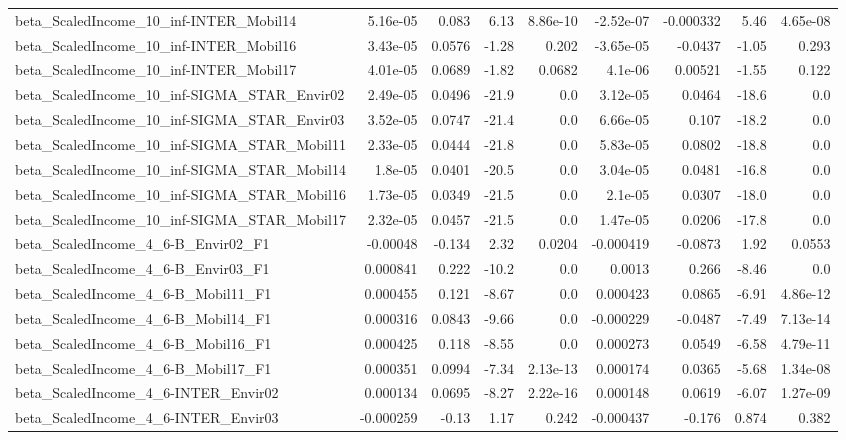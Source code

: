 \begin{tabular}{lrrrrrrrr}
beta_ScaledIncome_10_inf-INTER_Mobil14 & 5.16e-05 & 0.083 & 6.13 & 8.86e-10 & -2.52e-07 & -0.000332 & 5.46 & 4.65e-08 \\
beta_ScaledIncome_10_inf-INTER_Mobil16 & 3.43e-05 & 0.0576 & -1.28 & 0.202 & -3.65e-05 & -0.0437 & -1.05 & 0.293 \\
beta_ScaledIncome_10_inf-INTER_Mobil17 & 4.01e-05 & 0.0689 & -1.82 & 0.0682 & 4.1e-06 & 0.00521 & -1.55 & 0.122 \\
beta_ScaledIncome_10_inf-SIGMA_STAR_Envir02 & 2.49e-05 & 0.0496 & -21.9 & 0.0 & 3.12e-05 & 0.0464 & -18.6 & 0.0 \\
beta_ScaledIncome_10_inf-SIGMA_STAR_Envir03 & 3.52e-05 & 0.0747 & -21.4 & 0.0 & 6.66e-05 & 0.107 & -18.2 & 0.0 \\
beta_ScaledIncome_10_inf-SIGMA_STAR_Mobil11 & 2.33e-05 & 0.0444 & -21.8 & 0.0 & 5.83e-05 & 0.0802 & -18.8 & 0.0 \\
beta_ScaledIncome_10_inf-SIGMA_STAR_Mobil14 & 1.8e-05 & 0.0401 & -20.5 & 0.0 & 3.04e-05 & 0.0481 & -16.8 & 0.0 \\
beta_ScaledIncome_10_inf-SIGMA_STAR_Mobil16 & 1.73e-05 & 0.0349 & -21.5 & 0.0 & 2.1e-05 & 0.0307 & -18.0 & 0.0 \\
beta_ScaledIncome_10_inf-SIGMA_STAR_Mobil17 & 2.32e-05 & 0.0457 & -21.5 & 0.0 & 1.47e-05 & 0.0206 & -17.8 & 0.0 \\
beta_ScaledIncome_4_6-B_Envir02_F1 & -0.00048 & -0.134 & 2.32 & 0.0204 & -0.000419 & -0.0873 & 1.92 & 0.0553 \\
beta_ScaledIncome_4_6-B_Envir03_F1 & 0.000841 & 0.222 & -10.2 & 0.0 & 0.0013 & 0.266 & -8.46 & 0.0 \\
beta_ScaledIncome_4_6-B_Mobil11_F1 & 0.000455 & 0.121 & -8.67 & 0.0 & 0.000423 & 0.0865 & -6.91 & 4.86e-12 \\
beta_ScaledIncome_4_6-B_Mobil14_F1 & 0.000316 & 0.0843 & -9.66 & 0.0 & -0.000229 & -0.0487 & -7.49 & 7.13e-14 \\
beta_ScaledIncome_4_6-B_Mobil16_F1 & 0.000425 & 0.118 & -8.55 & 0.0 & 0.000273 & 0.0549 & -6.58 & 4.79e-11 \\
beta_ScaledIncome_4_6-B_Mobil17_F1 & 0.000351 & 0.0994 & -7.34 & 2.13e-13 & 0.000174 & 0.0365 & -5.68 & 1.34e-08 \\
beta_ScaledIncome_4_6-INTER_Envir02 & 0.000134 & 0.0695 & -8.27 & 2.22e-16 & 0.000148 & 0.0619 & -6.07 & 1.27e-09 \\
beta_ScaledIncome_4_6-INTER_Envir03 & -0.000259 & -0.13 & 1.17 & 0.242 & -0.000437 & -0.176 & 0.874 & 0.382 \\

\end{tabular}
